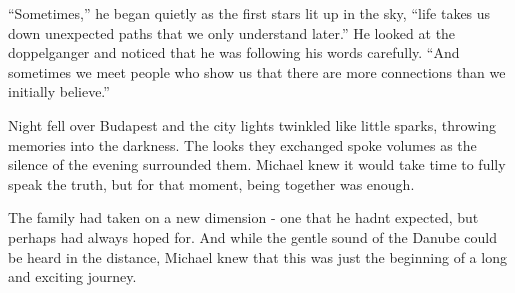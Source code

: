 \documentclass[
]{article}
\begin{document}
``Sometimes,'' he began quietly as the first stars lit up in the sky,
``life takes us down unexpected paths that we only understand later.''
He looked at the doppelganger and noticed that he was following his
words carefully. ``And sometimes we meet people who show us that there
are more connections than we initially believe.''

Night fell over Budapest and the city lights twinkled like little
sparks, throwing memories into the darkness. The looks they exchanged
spoke volumes as the silence of the evening surrounded them. Michael
knew it would take time to fully speak the truth, but for that moment,
being together was enough.

The family had taken on a new dimension - one that he
hadn\textquotesingle t expected, but perhaps had always hoped for. And
while the gentle sound of the Danube could be heard in the distance,
Michael knew that this was just the beginning of a long and exciting
journey.
\end{document}
